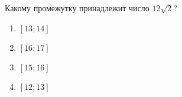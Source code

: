  
\begin{ex}
	Какому промежутку принадлежит число $12\sqrt{2}$?
	
	\selectanswer
	\begin{multicols}{4}
		\begin{enumerate}[label=\arabic*)]
			\item $[13;14]$
			\item $[16;17]$
			\item $[15;16]$
			\item $[12;13]$
		\end{enumerate}
	\end{multicols}
\end{ex}